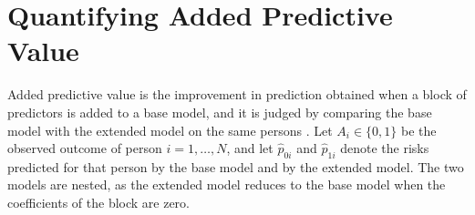 
\section{Quantifying Added Predictive Value}
\label{sec:tech-added-value}

Added predictive value is the improvement in prediction obtained when a block of predictors is added to a base model, and it is judged by comparing the base model with the extended model on the same persons \cite{steyerberg2010performance, steyerberg2019cpm}.
Let $A_i \in \{0, 1\}$ be the observed outcome of person $i = 1, \dots, N$, and let $\hat p_{0i}$ and $\hat p_{1i}$ denote the risks predicted for that person by the base model and by the extended model.
The two models are nested, as the extended model reduces to the base model when the coefficients of the block are zero.

